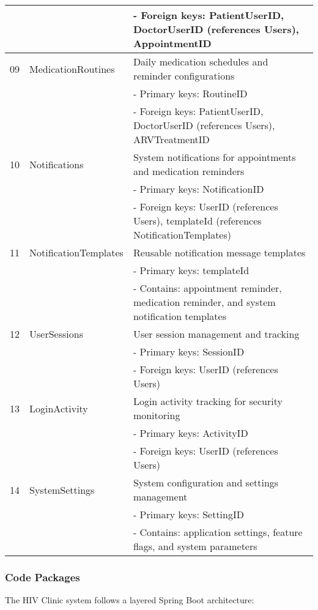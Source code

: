 \documentclass[12pt,a4paper]{article}
\begin{document}
\begin{longtable}{|p{1cm}|p{3cm}|p{10cm}|}
& & - Foreign keys: PatientUserID, DoctorUserID (references Users), AppointmentID \\
\hline
09 & MedicationRoutines & Daily medication schedules and reminder configurations \\
& & - Primary keys: RoutineID \\
& & - Foreign keys: PatientUserID, DoctorUserID (references Users), ARVTreatmentID \\
\hline
10 & Notifications & System notifications for appointments and medication reminders \\
& & - Primary keys: NotificationID \\
& & - Foreign keys: UserID (references Users), templateId (references NotificationTemplates) \\
\hline
11 & NotificationTemplates & Reusable notification message templates \\
& & - Primary keys: templateId \\
& & - Contains: appointment reminder, medication reminder, and system notification templates \\
\hline
12 & UserSessions & User session management and tracking \\
& & - Primary keys: SessionID \\
& & - Foreign keys: UserID (references Users) \\
\hline
13 & LoginActivity & Login activity tracking for security monitoring \\
& & - Primary keys: ActivityID \\
& & - Foreign keys: UserID (references Users) \\
\hline
14 & SystemSettings & System configuration and settings management \\
& & - Primary keys: SettingID \\
& & - Contains: application settings, feature flags, and system parameters \\
\hline
\end{longtable}

\subsubsection{Code Packages}

The HIV Clinic system follows a layered Spring Boot architecture:
\end{document}
